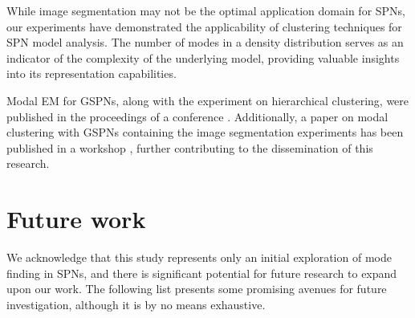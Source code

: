 While image segmentation may not be the optimal application domain for SPNs, our experiments have demonstrated the applicability of clustering techniques for SPN model analysis. The number of modes in a density distribution serves as an indicator of the complexity of the underlying model, providing valuable insights into its representation capabilities.

Modal EM for GSPNs, along with the experiment on hierarchical clustering, were published in the proceedings of a conference \citep{Madeira2022}. Additionally, a paper on modal clustering with GSPNs containing the image segmentation experiments has been published in a workshop \citep{Madeira2023}, further contributing to the dissemination of this research.

\section{Future work}
\label{sec:final:future}

We acknowledge that this study represents only an initial exploration of mode finding in SPNs, and there is significant potential for future research to expand upon our work. The following list presents some promising avenues for future investigation, although it is by no means exhaustive.

